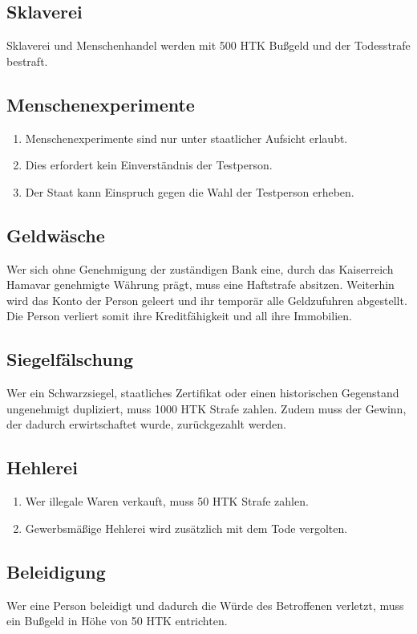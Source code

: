 \documentclass{article}
\begin{document}
\subsection{Sklaverei}
Sklaverei und Menschenhandel werden mit 500 HTK Bußgeld und der Todesstrafe bestraft.

\subsection{Menschenexperimente}
\begin{enumerate}[(1)]
    \item Menschenexperimente sind nur unter staatlicher Aufsicht erlaubt.
    \item Dies erfordert kein Einverständnis der Testperson.
    \item Der Staat kann Einspruch gegen die Wahl der Testperson erheben.
\end{enumerate}

\subsection{Geldwäsche}
Wer sich ohne Genehmigung der zuständigen Bank eine, durch das Kaiserreich Hamavar genehmigte Währung prägt, muss eine Haftstrafe absitzen. Weiterhin wird das Konto der Person geleert und ihr temporär alle Geldzufuhren abgestellt. Die Person verliert somit ihre Kreditfähigkeit und all ihre Immobilien.

\subsection{Siegelfälschung}
Wer ein Schwarzsiegel, staatliches Zertifikat oder einen historischen Gegenstand ungenehmigt dupliziert, muss 1000 HTK Strafe zahlen. Zudem muss der Gewinn, der dadurch erwirtschaftet wurde, zurückgezahlt werden.

\subsection{Hehlerei}
\begin{enumerate}[(1)]
    \item Wer illegale Waren verkauft, muss 50 HTK Strafe zahlen.
    \item Gewerbsmäßige Hehlerei wird zusätzlich mit dem Tode vergolten.
\end{enumerate}

\subsection{Beleidigung}
Wer eine Person beleidigt und dadurch die Würde des Betroffenen verletzt, muss ein Bußgeld in Höhe von 50 HTK entrichten.
\end{document}
